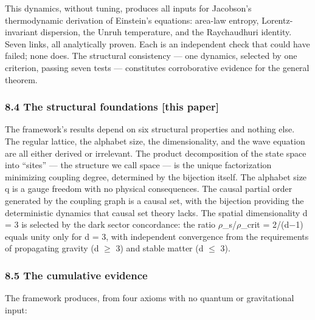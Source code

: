 \documentclass[
  11pt,
]{article}
\begin{document}
This dynamics, without tuning, produces all inputs for Jacobson's
thermodynamic derivation of Einstein's equations: area-law entropy,
Lorentz-invariant dispersion, the Unruh temperature, and the
Raychaudhuri identity. Seven links, all analytically proven. Each is an
independent check that could have failed; none does. The structural
consistency --- one dynamics, selected by one criterion, passing seven
tests --- constitutes corroborative evidence for the general theorem.

\hypertarget{the-structural-foundations-this-paper}{%
\subsubsection{8.4 The structural foundations {[}this
paper{]}}\label{the-structural-foundations-this-paper}}

The framework's results depend on six structural properties and nothing
else. The regular lattice, the alphabet size, the dimensionality, and
the wave equation are all either derived or irrelevant. The product
decomposition of the state space into ``sites'' --- the structure we
call space --- is the unique factorization minimizing coupling degree,
determined by the bijection itself. The alphabet size q is a gauge
freedom with no physical consequences. The causal partial order
generated by the coupling graph is a causal set, with the bijection
providing the deterministic dynamics that causal set theory lacks. The
spatial dimensionality d = 3 is selected by the dark sector concordance:
the ratio \ensuremath{\rho}\_s/\ensuremath{\rho}\_crit = 2/(d\ensuremath{-}1) equals unity only for d = 3, with
independent convergence from the requirements of propagating gravity (d
\ensuremath{\geq} 3) and stable matter (d \ensuremath{\leq} 3).

\hypertarget{the-cumulative-evidence}{%
\subsubsection{8.5 The cumulative
evidence}\label{the-cumulative-evidence}}

The framework produces, from four axioms with no quantum or
gravitational input:
\end{document}
